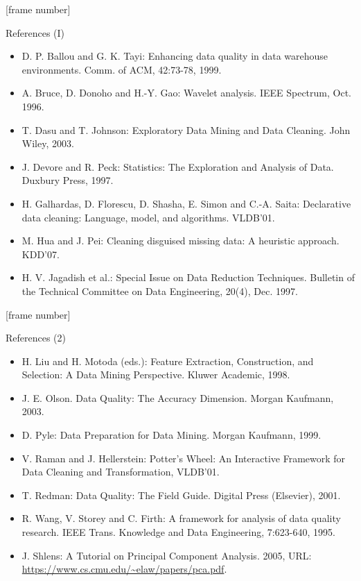 \documentclass[aspectratio=169,t]{beamer}
\begin{document}
  {
    [frame number]
    \begin{frame}{References (I)}
      \begin{itemize}
        \item D. P. Ballou and G. K. Tayi: Enhancing data quality in data warehouse environments. Comm. of ACM, 42:73-78, 1999.
        \item A. Bruce, D. Donoho and H.-Y. Gao: Wavelet analysis. IEEE Spectrum, Oct. 1996.
        \item {\color{airforceblue}T. Dasu and T. Johnson:  Exploratory Data Mining and Data Cleaning. John Wiley, 2003.}
        \item J. Devore and R. Peck: Statistics: The Exploration and Analysis of Data. Duxbury Press, 1997.
        \item H. Galhardas, D. Florescu, D. Shasha, E. Simon and C.-A. Saita: Declarative data cleaning: Language, model, and algorithms. VLDB'01.
        \item M. Hua and J. Pei: Cleaning disguised missing data: A heuristic approach. KDD'07.
        \item {\color{airforceblue}H. V. Jagadish et al.: Special Issue on Data Reduction Techniques.  Bulletin of the Technical Committee on Data Engineering, 20(4), Dec. 1997.}
      \end{itemize}
    \end{frame}
  }


  {
    [frame number]
    \begin{frame}{References (2)}
      \begin{itemize}
        \item H. Liu and H. Motoda (eds.): Feature Extraction, Construction, and Selection: A Data Mining Perspective. Kluwer Academic, 1998.
        \item J. E. Olson. Data Quality: The Accuracy Dimension. Morgan Kaufmann, 2003.
        \item D. Pyle: Data Preparation for Data Mining. Morgan Kaufmann, 1999.
        \item {\color{airforceblue}V. Raman and J. Hellerstein: Potter's Wheel: An Interactive Framework for Data Cleaning and Transformation, VLDB'01.}
        \item T. Redman: Data Quality: The Field Guide. Digital Press (Elsevier), 2001.
        \item R. Wang, V. Storey and C. Firth: A framework for analysis of data quality research. IEEE Trans. Knowledge and Data Engineering, 7:623-640, 1995.
        \item J. Shlens: A Tutorial on Principal Component Analysis. 2005, URL: \url{https://www.cs.cmu.edu/~elaw/papers/pca.pdf}.
      \end{itemize}
    \end{frame}
  }
\end{document}
